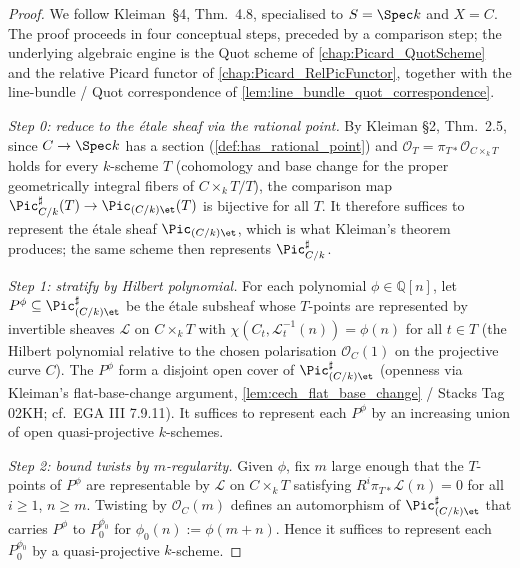 \begin{proof}

  We follow Kleiman~\S 4, Thm.~4.8, specialised to \(S = \Spec k\) and
  \(X = C\). The proof proceeds in four conceptual steps, preceded by a
  comparison step; the underlying algebraic engine is the Quot scheme of
  \cref{chap:Picard_QuotScheme} and the relative Picard functor of
  \cref{chap:Picard_RelPicFunctor}, together with the line-bundle / Quot
  correspondence of \cref{lem:line_bundle_quot_correspondence}.

  \emph{Step 0: reduce to the \'etale sheaf via the rational point.}
  By Kleiman \S 2, Thm.~2.5, since \(C \to \Spec k\) has a section
  (\cref{def:has_rational_point}) and \(\mathcal O_T = \pi_{T*}
  \mathcal O_{C \times_k T}\) holds for every \(k\)-scheme \(T\) (cohomology
  and base change for the proper geometrically integral fibers of
  \(C\times_k T/T\)), the comparison map
  \(\Pic^\sharp_{C/k}(T) \to \Pic_{(C/k)\et}(T)\) is bijective for all
  \(T\). It therefore suffices to represent the \'etale sheaf
  \(\Pic_{(C/k)\et}\), which is what Kleiman's theorem produces; the same
  scheme then represents \(\Pic^\sharp_{C/k}\).

  \emph{Step 1: stratify by Hilbert polynomial.}
  For each polynomial \(\phi \in \mathbb{Q}[n]\), let \(P^\phi \subseteq
  \Pic^\sharp_{(C/k)\et}\) be the \'etale subsheaf whose \(T\)-points are
  represented by invertible sheaves \(\mathcal{L}\) on \(C \times_k T\) with
  \(\chi(C_t, \mathcal{L}_t^{-1}(n)) = \phi(n)\) for all \(t \in T\) (the
  Hilbert polynomial relative to the chosen polarisation
  \(\mathcal{O}_C(1)\) on the projective curve \(C\)). The \(P^\phi\) form a
  disjoint open cover of \(\Pic^\sharp_{(C/k)\et}\) (openness via Kleiman's
  flat-base-change argument, \cref{lem:cech_flat_base_change} / Stacks Tag 02KH;
  cf.\ EGA III 7.9.11). It suffices to
  represent each \(P^\phi\) by an increasing union of open quasi-projective
  \(k\)-schemes.

  \emph{Step 2: bound twists by \(m\)-regularity.}
  Given \(\phi\), fix \(m\) large enough that the \(T\)-points of \(P^\phi\) are
  representable by \(\mathcal{L}\) on \(C \times_k T\) satisfying
  \(R^i \pi_{T*} \mathcal{L}(n) = 0\) for all \(i \ge 1\), \(n \ge m\). Twisting
  by \(\mathcal{O}_C(m)\) defines an automorphism of \(\Pic^\sharp_{(C/k)\et}\)
  that carries \(P^\phi\) to \(P^{\phi_0}_0\) for \(\phi_0(n) := \phi(m + n)\).
  Hence it suffices to represent each \(P^{\phi_0}_0\) by a quasi-projective
  \(k\)-scheme.


\end{proof}
